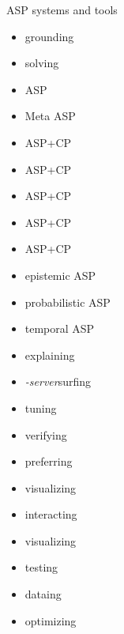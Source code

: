 \providecommand{\purpose}[1]{\hfill #1}
\begin{frame}[c]{ASP systems and tools}
  \begin{minipage}[t]{0.5\linewidth}
    \begin{itemize}
    \item \gringo\purpose{grounding}
    \item \clasp\purpose{solving}
    \item \clingo\purpose{ASP}
    \item \metasp\purpose{Meta ASP}
    \item \clingcon\purpose{ASP+CP}
    \item \fclingo\purpose{ASP+CP}
    \item \clingodl\purpose{ASP+CP}
    \item \clingolp\purpose{ASP+CP}
    \item \clingolpx\purpose{ASP+CP}
    \item \eclingo\purpose{epistemic ASP}
    \item \plingo\purpose{probabilistic ASP}
    \item \telingo\purpose{temporal ASP}
    \end{itemize}
  \end{minipage}
  \pause
  \begin{minipage}[t]{0.4\linewidth}
    \begin{itemize}
    \item \xclingo\purpose{explaining}
    \item \clingo\textit{-server}\purpose{surfing}
    \item \acclingo\purpose{tuning}
    \item \anthem\purpose{verifying}
    \item \asprin\purpose{preferring}
    \item \clingraph\purpose{visualizing}
    \item \clinguin\purpose{interacting}
    \item \viasp\purpose{visualizing}
    \item \clintest\purpose{testing}
    \item \clorm\purpose{dataing}
    \item \ngo\purpose{optimizing}
  \end{itemize}
\end{minipage}
\end{frame}
%
